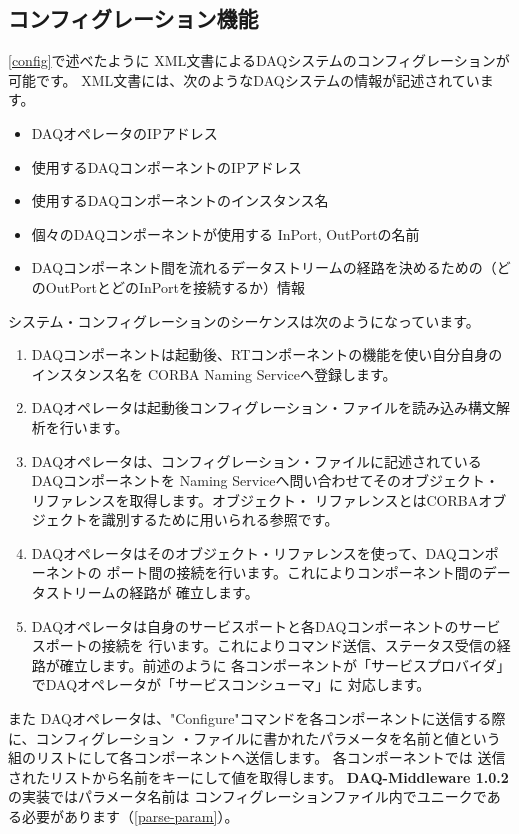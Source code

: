 \documentclass[a4j,10pt,dvips,onecolumn,oneside,final]{jarticle}%
\newcommand {\daqmwcurrent} {
	{\bf DAQ-Middleware 1.0.2}
}
\begin{document}
\subsection{コンフィグレーション機能}\label{operator-config}
\ref{config}で述べたように XML文書によるDAQシステムのコンフィグレーションが可能です。
XML文書には、次のようなDAQシステムの情報が記述されています。
\begin{itemize}
\item DAQオペレータのIPアドレス
\item 使用するDAQコンポーネントのIPアドレス
\item 使用するDAQコンポーネントのインスタンス名
\item 個々のDAQコンポーネントが使用する InPort, OutPortの名前
\item DAQコンポーネント間を流れるデータストリームの経路を決めるための（どのOutPortとどのInPortを接続するか）情報
\end{itemize}

システム・コンフィグレーションのシーケンスは次のようになっています。
\begin{enumerate}
\item DAQコンポーネントは起動後、RTコンポーネントの機能を使い自分自身のインスタンス名を 
  CORBA Naming Serviceへ登録します。
\item DAQオペレータは起動後コンフィグレーション・ファイルを読み込み構文解析を行います。
\item DAQオペレータは、コンフィグレーション・ファイルに記述されているDAQコンポーネントを
Naming Serviceへ問い合わせてそのオブジェクト・リファレンスを取得します。オブジェクト・
リファレンスとはCORBAオブジェクトを識別するために用いられる参照です。
\item DAQオペレータはそのオブジェクト・リファレンスを使って、DAQコンポーネントの
  ポート間の接続を行います。これによりコンポーネント間のデータストリームの経路が
  確立します。
\item DAQオペレータは自身のサービスポートと各DAQコンポーネントのサービスポートの接続を
  行います。これによりコマンド送信、ステータス受信の経路が確立します。前述のように
  各コンポーネントが「サービスプロバイダ」でDAQオペレータが「サービスコンシューマ」に
  対応します。
\end{enumerate}

また DAQオペレータは、"Configure"コマンドを各コンポーネントに送信する際に、コンフィグレーション
・ファイルに書かれたパラメータを名前と値という組のリストにして各コンポーネントへ送信します。
各コンポーネントでは
送信されたリストから名前をキーにして値を取得します。\daqmwcurrent の実装ではパラメータ名前は
コンフィグレーションファイル内でユニークである必要があります（\ref{parse-param}）。
\end{document}
